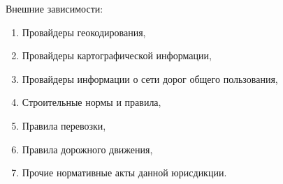 Внешние зависимости:
\begin{enumerate}
    \item Провайдеры геокодирования,
    \item Провайдеры картографической информации,
    \item Провайдеры информации о сети дорог общего пользования,
    \item Строительные нормы и правила,
    \item Правила перевозки,
    \item Правила дорожного движения,
    \item Прочие нормативные акты данной юрисдикции.
\end{enumerate}

\endinput
